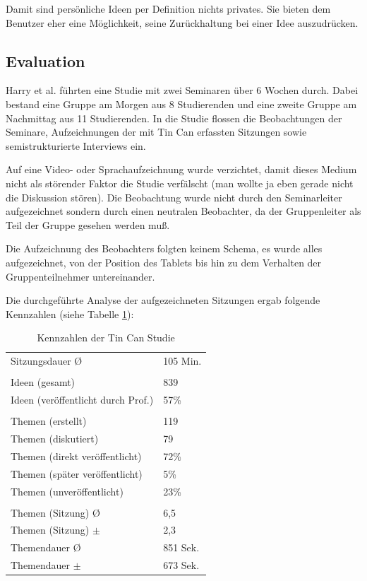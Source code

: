 Damit sind persönliche Ideen per Definition nichts privates. Sie bieten dem
Benutzer eher eine Möglichkeit, seine Zurückhaltung bei einer Idee auszudrücken.


\subsection{Evaluation}
Harry et al. \cite{HarGorSch2012} führten eine Studie mit zwei Seminaren über 6 Wochen durch. Dabei
bestand eine Gruppe am Morgen aus 8 Studierenden und eine zweite Gruppe am
Nachmittag aus 11 Studierenden. In die Studie flossen die Beobachtungen der
Seminare, Aufzeichnungen der mit Tin Can erfassten Sitzungen sowie
semistrukturierte Interviews ein.

Auf eine Video- oder Sprachaufzeichnung wurde verzichtet, damit dieses
Medium nicht als störender Faktor die Studie verfälscht (man wollte ja eben gerade
nicht die Diskussion stören). Die Beobachtung wurde nicht durch den
Seminarleiter aufgezeichnet sondern durch einen neutralen Beobachter, da der
Gruppenleiter als Teil der Gruppe gesehen werden muß.

Die Aufzeichnung des Beobachters folgten keinem Schema, es wurde alles
aufgezeichnet, von der Position des Tablets bis hin zu dem Verhalten der
Gruppenteilnehmer untereinander.

Die durchgeführte Analyse der aufgezeichneten Sitzungen ergab folgende Kennzahlen (siehe Tabelle \ref{tincan_kennz}):

\begin{table}[htp]
  \begin{tabular}{ l  l }
    Sitzungsdauer \O & 105 Min.\\
    \\
    Ideen  (gesamt) &  839 \\
    Ideen  (veröffentlicht durch Prof.) & 57\% \\
    \\
    Themen (erstellt) & 119 \\
    Themen (diskutiert) & 79 \\
    Themen (direkt veröffentlicht) & 72\% \\
    Themen (später veröffentlicht) & 5\% \\ 
    Themen (unveröffentlicht) & 23\% \\
    \\
    Themen (Sitzung) \O & 6,5 \\
    Themen (Sitzung) $\pm$ & 2,3 \\
    Themendauer \O & 851 Sek. \\
    Themendauer $\pm$ & 673 Sek. \\
  \end{tabular}
  \caption{Kennzahlen der Tin Can Studie}
  \label{tincan_kennz}
\end{table}

